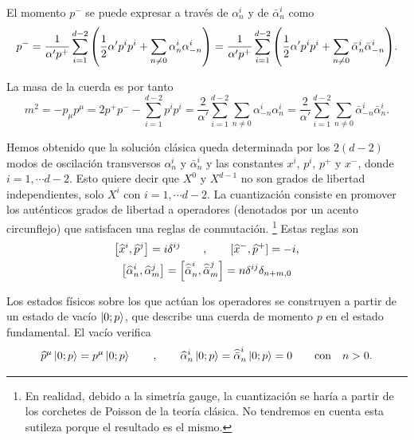 El momento $p^-$ se puede expresar a través de $\alpha^i_n$ y de $\bar \alpha^i_n$ como
\begin{equation}
  p^- = \frac{1}{\alpha' p^+}\sum_{i=1}^{d-2} \qty(\frac{1}{2}\alpha'p^i p^i +\sum_{n\neq0}\alpha_n^i\alpha_{-n}^i) 
   = \frac{1}{\alpha' p^+}\sum_{i=1}^{d-2} \qty(\frac{1}{2}\alpha'p^i p^i +\sum_{n\neq0}\bar \alpha_n^i\bar \alpha_{-n}^i) .
\end{equation}

La masa de la cuerda es por tanto
\begin{equation}
  m^2=-p_\mu p^\mu = 2p^+p^- - \sum_{i=1}^{d-2} p^i p^i = 
  \frac{2}{\alpha'}\sum_{i=1}^{d-2} \sum_{n\neq 0} \alpha_{-n}^i \alpha_n^i
  =\frac{2}{\alpha'}\sum_{i=1}^{d-2} \sum_{n\neq 0}\bar \alpha_{-n}^i \bar\alpha_n^i.
  \label{eq:mass}
\end{equation}

Hemos obtenido que la solución clásica queda determinada por los $2(d-2)$ modos de oscilación transversos 
$\alpha^i_n$ y $\bar \alpha_n^i$ y las constantes $x^i$, $p^i$, $p^+$ y $x^-$, donde $i=1,\cdots d-2$.
Esto quiere decir que $X^0$ y $X^{d-1}$ no son grados de libertad independientes, solo $X^i$ 
con $i=1,\cdots d-2$.
La cuantización consiste en promover los auténticos grados de libertad a operadores (denotados
por un acento circunflejo) que satisfacen una reglas de conmutación.
\footnote{En realidad, debido a la simetría gauge, la cuantización se haría a partir de los
corchetes de Poisson de la teoría clásica. No tendremos en cuenta esta sutileza porque el
resultado es el mismo.}
Estas reglas son
\begin{equation}
  \begin{gathered}
    \qty[\widehat x^i,\widehat p^j] = i\delta^{ij}\qquad , \qquad [\widehat x^-,\widehat p^+] = -i,\\
    \qty[\widehat \alpha_n^i,\widehat \alpha_m^j]= \qty[\widehat {\bar \alpha}_n^i,\widehat {\bar \alpha}_m^j]= n \delta^{ij}\delta_{n+m,0}
  \end{gathered}
\end{equation}

Los estados físicos sobre los que actúan los operadores se construyen a partir de un estado 
de vacío $\ket{0;p}$, que describe una cuerda de momento $p$ en el estado fundamental.
El vacío verifica
\begin{equation}
  \widehat p^\mu \ket{0;p} = p^\mu \ket{0;p} \qquad, \qquad \widehat \alpha^i_n\ket{0;p}=\widehat {\bar\alpha}^i_n\ket{0;p} = 0 \qquad \text{con} \quad n>0.
\end{equation}

